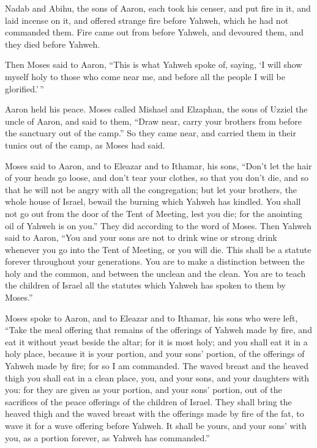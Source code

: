  Nadab and Abihu, the sons of Aaron, each took his censer,
and put fire in it, and laid incense on it, and offered strange fire
before Yahweh, which he had not commanded them.  Fire came
out from before Yahweh, and devoured them, and they died before Yahweh.

 Then Moses said to Aaron, ``This is what Yahweh spoke of,
saying, `I will show myself holy to those who come near me, and before
all the people I will be glorified.'\,''

Aaron held his peace.  Moses called Mishael and Elzaphan,
the sons of Uzziel the uncle of Aaron, and said to them, ``Draw near,
carry your brothers from before the sanctuary out of the camp.''
 So they came near, and carried them in their tunics out of
the camp, as Moses had said.

 Moses said to Aaron, and to Eleazar and to Ithamar, his
sons, ``Don't let the hair of your heads go loose, and don't tear your
clothes, so that you don't die, and so that he will not be angry with
all the congregation; but let your brothers, the whole house of Israel,
bewail the burning which Yahweh has kindled.  You shall not
go out from the door of the Tent of Meeting, lest you die; for the
anointing oil of Yahweh is on you.'' They did according to the word of
Moses.  Then Yahweh said to Aaron,  ``You and
your sons are not to drink wine or strong drink whenever you go into the
Tent of Meeting, or you will die. This shall be a statute forever
throughout your generations.  You are to make a distinction
between the holy and the common, and between the unclean and the clean.
 You are to teach the children of Israel all the statutes
which Yahweh has spoken to them by Moses.''

 Moses spoke to Aaron, and to Eleazar and to Ithamar, his
sons who were left, ``Take the meal offering that remains of the
offerings of Yahweh made by fire, and eat it without yeast beside the
altar; for it is most holy;  and you shall eat it in a holy
place, because it is your portion, and your sons' portion, of the
offerings of Yahweh made by fire; for so I am commanded. 
The waved breast and the heaved thigh you shall eat in a clean place,
you, and your sons, and your daughters with you: for they are given as
your portion, and your sons' portion, out of the sacrifices of the peace
offerings of the children of Israel.  They shall bring the
heaved thigh and the waved breast with the offerings made by fire of the
fat, to wave it for a wave offering before Yahweh. It shall be yours,
and your sons' with you, as a portion forever, as Yahweh has
commanded.''

